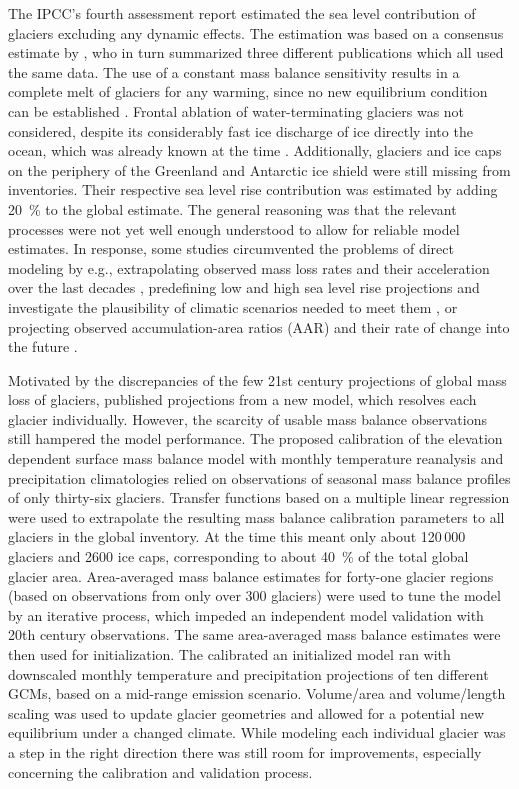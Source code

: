     The IPCC's fourth assessment report \citep{IPCC2007} estimated the sea level contribution of glaciers excluding any dynamic effects. The estimation was based on a consensus estimate by \citet{Kaser2006}, who in turn summarized three different publications which all used the same data. The use of a constant mass balance sensitivity results in a complete melt of glaciers for any warming, since no new equilibrium condition can be established \citep{Raper2006, Pfeffer2008}. Frontal ablation of water-terminating glaciers was not considered, despite its considerably fast ice discharge of ice directly into the ocean, which was already known at the time \citep{Pfeffer2008}. Additionally, glaciers and ice caps on the periphery of the Greenland and Antarctic ice shield were still missing from inventories. Their respective sea level rise contribution was estimated by adding \SI{20}{\percent} to the global estimate. The general reasoning was that the relevant processes were not yet well enough understood to allow for reliable model estimates. In response, some studies circumvented the problems of direct modeling by e.g., extrapolating observed mass loss rates and their acceleration over the last decades \citep{Meier2007}, predefining low and high sea level rise projections and investigate the plausibility of climatic scenarios needed to meet them \citep{Pfeffer2008}, or projecting observed accumulation-area ratios (AAR) and their rate of change into the future \citep{Bahr2009}.

    Motivated by the discrepancies of the few 21st century projections of global mass loss of glaciers, \citet{Radic2011} published projections from a new model, which resolves each glacier individually. However, the scarcity of usable mass balance observations still hampered the model performance. The proposed calibration of the elevation dependent surface mass balance model with monthly temperature reanalysis and precipitation climatologies relied on observations of seasonal mass balance profiles of only thirty-six glaciers. Transfer functions based on a multiple linear regression were used to extrapolate the resulting mass balance calibration parameters to all glaciers in the global inventory. At the time this meant only about 120\,000 glaciers and 2600 ice caps, corresponding to about \SI{40}{\percent} of the total global glacier area. Area-averaged mass balance estimates for forty-one glacier regions (based on observations from only over 300 glaciers) were used to tune the model by an iterative process, which impeded an independent model validation with 20th century observations. The same area-averaged mass balance estimates were then used for initialization. The calibrated an initialized model ran with downscaled monthly temperature and precipitation projections of ten different GCMs, based on a mid-range emission scenario. Volume/area and volume/length scaling was used to update glacier geometries and allowed for a potential new equilibrium under a changed climate. While modeling each individual glacier was a step in the right direction there was still room for improvements, especially concerning the calibration and validation process.

